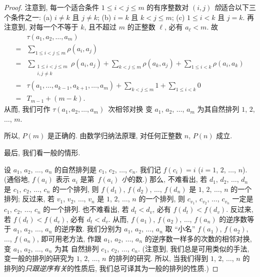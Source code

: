 \begin{proof}
    注意到, 每一个适合条件 \(1 \leq i < j \leq m\)
    的有序整数对 \((i, j)\)
    \emph{恰}适合以下三个条件之一:
    (a)
    \(i \neq k\) 且 \(j \neq k\);
    (b)
    \(i = k\) 且 \(k < j \leq m\);
    (c)
    \(1 \leq i < k\) 且 \(j = k\).
    再注意到, 对每一个不等于 \(k\),
    且不超过 \(m\) 的正整数 \(\ell\),
    必有 \(a_\ell < m\).
    故
    \begin{align*}
             & \tau (a_1, a_2, \dots, a_m)
        \\
        = {} &
        \sum_{1 \leq i < j \leq m} {\rho(a_i, a_j)}
        \\
        = {} &
        \sum_{\substack{1 \leq i < j \leq m \\i,j \neq k}}
        {\rho(a_i, a_j)}
        + \sum_{k < j \leq m} {\rho(a_k, a_j)}
        + \sum_{1 \leq i < k} {\rho(a_i, a_k)}
        \\
        = {} &
        \tau (a_1, \dots, a_{k-1}, a_{k+1}, \dots, a_m)
        + \sum_{k < j \leq m} {1}
        + \sum_{1 \leq i < k} {0}
        \\
        = {} &
        T_{m-1} + (m - k).
    \end{align*}
    从而, 我们可作
    \(\tau (a_1, a_2, \dots, a_m)\)~次相邻对换%
    变 \(a_1\), \(a_2\), \(\dots\), \(a_m\)
    为其自然排列 \(1\), \(2\), \(\dots\), \(m\).

    所以, \(P(m)\) 是正确的.
    由数学归纳法原理,
    对任何正整数 \(n\), \(P(n)\) 成立.

    最后, 我们看一般的情形.

    设 \(a_1\), \(a_2\), \(\dots\), \(a_n\)
    的自然排列是 \(c_1\), \(c_2\), \(\dots\), \(c_n\).
    我们记 \(f(c_i) = i\)
    (\(i = 1\), \(2\), \(\dots\), \(n\)).
    (通俗地, \(f(a_i)\) 表示
    \(a_i\) 是第~\(f(a_i)\) \emph{小}的数.)
    那么, 不难看出,
    若 \(d_1\), \(d_2\), \(\dots\), \(d_n\)
    是 \(c_1\), \(c_2\), \(\dots\), \(c_n\)
    的一个排列,
    则 \(f(d_1)\), \(f(d_2)\), \(\dots\), \(f(d_n)\)
    是 \(1\), \(2\), \(\dots\), \(n\)
    的一个排列;
    反过来, 若 \(v_1\), \(v_2\), \(\dots\), \(v_n\) 是
    \(1\), \(2\), \(\dots\), \(n\) 的一个排列,
    则 \(c_{v_1}\), \(c_{v_2}\), \(\dots\), \(c_{v_n}\)
    一定是 \(c_1\), \(c_2\), \(\dots\), \(c_n\) 的一个排列.
    也不难看出, 若 \(d_t < d_v\), 必有 \(f(d_t) < f(d_v)\).
    反过来, 若 \(f(d_t) < f(d_v)\), 必有 \(d_t < d_v\).
    从而, \(f(a_1)\), \(f(a_2)\), \(\dots\), \(f(a_n)\)
    的逆序数等于 \(a_1\), \(a_2\), \(\dots\), \(a_n\)
    的逆序数.
    我们分别为 \(a_1\), \(a_2\), \(\dots\), \(a_n\)
    取 ``小名'' \(f(a_1)\), \(f(a_2)\), \(\dots\), \(f(a_n)\),
    即可用老方法,
    作跟 \(a_1\), \(a_2\), \(\dots\), \(a_n\)
    的逆序数一样多的次数的相邻对换,
    变 \(a_1\), \(a_2\), \(\dots\), \(a_n\) 为其%
    自然排列 \(c_1\), \(c_2\), \(\dots\), \(c_n\).
    (注意到, 我们总是可用类似的手法,
    变一般的排列的研究为
    \(1\), \(2\), \(\dots\), \(n\) 的排列的研究.
    所以, 当我们得到
    \(1\), \(2\), \(\dots\), \(n\)
    的排列的\emph{只跟逆序有关}的性质后,
    我们总可译其为一般的排列的性质.)
\end{proof}

